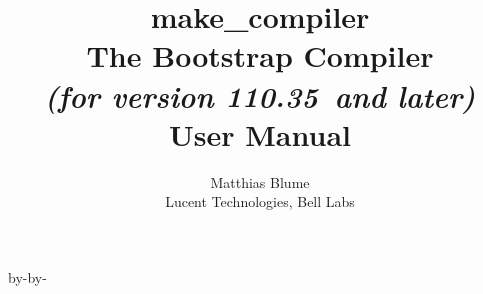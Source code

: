 \usepackage{times}

\advance\topmargin by-\headheight\advance\topmargin by-\headsep
\textwidth6.7in

\newcommand{\smlmj}{110}
\newcommand{\smlmn}{35}

\author{Matthias Blume \\
Lucent Technologies, Bell Labs}

\title{{\bf make_compiler}\\
The Bootstrap Compiler \\
{\it\small (for version \smlmj.\smlmn~and later)} \\
User Manual}

\setlength{\parindent}{0pt}
\setlength{\parskip}{6pt plus 3pt minus 2pt}





\maketitle

\pagebreak

\tableofcontents

\pagebreak








\pagebreak





